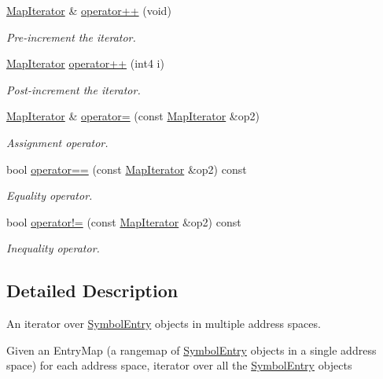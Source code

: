\begin{DoxyCompactItemize}
\mbox{\hyperlink{class_map_iterator}{Map\+Iterator}} \& \mbox{\hyperlink{class_map_iterator_a4ecea040ac1d04ae13e91a183c7a0f98}{operator++}} (void)
\begin{DoxyCompactList}\small\item\em Pre-\/increment the iterator. \end{DoxyCompactList}\item 
\mbox{\hyperlink{class_map_iterator}{Map\+Iterator}} \mbox{\hyperlink{class_map_iterator_aaf03aa823497e381f15d1d13143af4fb}{operator++}} (int4 i)
\begin{DoxyCompactList}\small\item\em Post-\/increment the iterator. \end{DoxyCompactList}\item 
\mbox{\hyperlink{class_map_iterator}{Map\+Iterator}} \& \mbox{\hyperlink{class_map_iterator_aaf72515b87e4a7a920c75e8abcb02dd2}{operator=}} (const \mbox{\hyperlink{class_map_iterator}{Map\+Iterator}} \&op2)
\begin{DoxyCompactList}\small\item\em Assignment operator. \end{DoxyCompactList}\item 
bool \mbox{\hyperlink{class_map_iterator_a151d7bd51ce682e79ced5a8552132bdc}{operator==}} (const \mbox{\hyperlink{class_map_iterator}{Map\+Iterator}} \&op2) const
\begin{DoxyCompactList}\small\item\em Equality operator. \end{DoxyCompactList}\item 
bool \mbox{\hyperlink{class_map_iterator_a0c43c823c275b4c1f821360ba3eaf745}{operator!=}} (const \mbox{\hyperlink{class_map_iterator}{Map\+Iterator}} \&op2) const
\begin{DoxyCompactList}\small\item\em Inequality operator. \end{DoxyCompactList}\end{DoxyCompactItemize}


\subsection{Detailed Description}
An iterator over \mbox{\hyperlink{class_symbol_entry}{Symbol\+Entry}} objects in multiple address spaces. 

Given an Entry\+Map (a rangemap of \mbox{\hyperlink{class_symbol_entry}{Symbol\+Entry}} objects in a single address space) for each address space, iterator over all the \mbox{\hyperlink{class_symbol_entry}{Symbol\+Entry}} objects 

